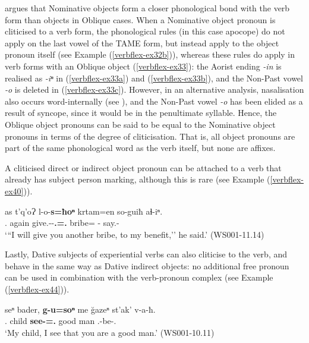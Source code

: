 \textcite{kojima19} argues that Nominative objects form a closer phonological bond with the verb form than objects in Oblique cases. When a Nominative object pronoun is cliticised to a verb form, the phonological rules (in this case apocope) do not apply on the last vowel of the TAME form, but instead apply to the object pronoun itself (see Example (\ref{verbflex-ex32b})), whereas these rules do apply in verb forms with an Oblique object (\ref{verbflex-ex33}): the Aorist ending \textit{-in} is realised as \textit{-iⁿ} in (\ref{verbflex-ex33a}) and (\ref{verbflex-ex33b}), and the Non-Past vowel \textit{-o} is deleted in (\ref{verbflex-ex33c}). However, in an alternative analysis, nasalisation also occurs word-internally (see ), and the Non-Past vowel \textit{-o} has been elided as a result of syncope, since it would be in the penultimate syllable. Hence, the Oblique object pronouns can be said to be equal to the Nominative object pronouns in terms of the degree of cliticisation. That is, all object pronouns are part of the same phonological word as the verb itself, but none are affixes.

A cliticised direct or indirect object pronoun can be attached to a verb that already has subject person marking, although this is rare (see Example (\ref{verbflex-ex40})).



	\begin{exe}
		\ex\label{verbflex-ex40}
		\gll  as t'q'oɁ l-o-\textbf{s=ħoⁿ} krtam=en so-guiħ aɬ-iⁿ. \\
		{\Fsg}.{\Erg} again give.{\Pfv}-{\Npst}-\textbf{{\Fsg}.{\Erg}={\Ssg}.{\Dat}} bribe={\Quot} {\Fsg}-{\Apudlat} say.{\Pfv}-{\Aor} \\
		\trans `{``}I will give you another bribe, to my benefit,'' he said.'
		\hfill (WS001-11.14)
	\end{exe}


Lastly, Dative subjects of experiential verbs can also cliticise to the verb, and behave in the same way as Dative indirect objects: no additional free pronoun can be used in combination with the verb-pronoun complex (see Example (\ref{verbflex-ex44})).


	\begin{exe}
		\ex\label{verbflex-ex44}
		\gll seⁿ bader, \textbf{g-u=soⁿ} me \u{g}azeⁿ st'ak' v-a-ħ. \\
		{\Fsg}.{\Gen} child \textbf{see-{\Npst}={\Fsg}.{\Dat}} {\Subord} good man {\M}.{\Sg}-be-{\Ssg}.{\Nom} \\
		\trans `My child, I see that you are a good man.'
		\hfill (WS001-10.11)
	\end{exe}



